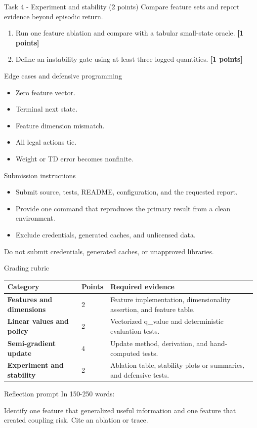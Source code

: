 \documentclass[aspectratio=169,11pt]{beamer}
\begin{document}
\begin{frame}{Task 4 - Experiment and stability (2 points)}
\small
Compare feature sets and report evidence beyond episodic return.

\vspace{0.2cm}
\begin{enumerate}
\item[\textbf{a.}] Run one feature ablation and compare with a tabular small-state oracle. \hfill{\color{courseblue}\textbf{[1 points]}}
\item[\textbf{b.}] Define an instability gate using at least three logged quantities. \hfill{\color{courseblue}\textbf{[1 points]}}
\end{enumerate}
\end{frame}

\begin{frame}{Edge cases and defensive programming}
\small
\begin{itemize}
  \item Zero feature vector.
  \item Terminal next state.
  \item Feature dimension mismatch.
  \item All legal actions tie.
  \item Weight or TD error becomes nonfinite.
\end{itemize}
\end{frame}

\begin{frame}{Submission instructions}
\small
\begin{itemize}
  \item Submit source, tests, README, configuration, and the requested report.
  \item Provide one command that reproduces the primary result from a clean environment.
  \item Exclude credentials, generated caches, and unlicensed data.
\end{itemize}
\vspace{0.2cm}
\alert{Do not submit credentials, generated caches, or unapproved libraries.}
\end{frame}

\begin{frame}{Grading rubric}
\scriptsize
\begin{tabularx}{\textwidth}{>{\bfseries}p{} p{} X}
\toprule
Category & Points & Required evidence \\
\midrule
Features and dimensions & 2 & Feature implementation, dimensionality assertion, and feature table. \\
Linear values and policy & 2 & Vectorized q\_value and deterministic evaluation tests. \\
Semi-gradient update & 4 & Update method, derivation, and hand-computed tests. \\
Experiment and stability & 2 & Ablation table, stability plots or summaries, and defensive tests. \\
\bottomrule
\end{tabularx}
\end{frame}

\begin{frame}{Reflection prompt}
In 150-250 words:

Identify one feature that generalized useful information and one feature that created coupling risk. Cite an ablation or trace.
\end{frame}
\end{document}
